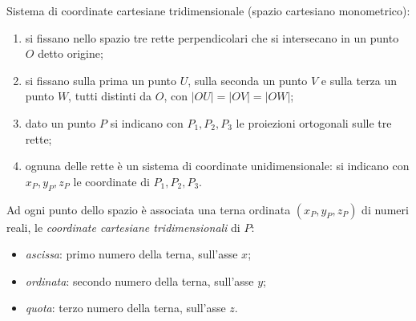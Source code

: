 \documentclass[11pt,a4paper]{article}
\begin{document}
Sistema di coordinate cartesiane tridimensionale (spazio cartesiano monometrico):
\begin{enumerate}
    \item si fissano nello spazio tre rette perpendicolari che si intersecano in un punto $O$ detto origine;
    \item si fissano sulla prima un punto $U$, sulla seconda un punto $V$ e sulla terza un punto $W$, tutti distinti da $O$, con $|OU| = |OV| = |OW|$;
    \item dato un punto $P$ si indicano con $P_1, P_2, P_3$ le proiezioni ortogonali sulle tre rette;
    \item ognuna delle rette è un sistema di coordinate unidimensionale: si indicano con $x_P, y_P, z_P$ le coordinate di $P_1, P_2, P_3$.
\end{enumerate}
Ad ogni punto dello spazio è associata una terna ordinata $(x_P, y_P, z_P)$ di numeri reali, le \emph{coordinate cartesiane tridimensionali} di $P$:
\begin{itemize}
    \item \emph{ascissa}: primo numero della terna, sull'asse $x$;
    \item \emph{ordinata}: secondo numero della terna, sull'asse $y$;
    \item \emph{quota}: terzo numero della terna, sull'asse $z$.
\end{itemize}

\begin{center}
\end{center}
\end{document}
